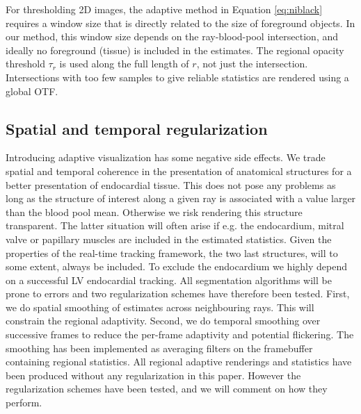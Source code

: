 For thresholding 2D images, the adaptive method in Equation \ref{eq:niblack} requires a window size that is directly related to the size of foreground objects. In our method, this window size depends on the ray-blood-pool intersection, and ideally no foreground (tissue) is included in the estimates. The regional opacity threshold $\tau_r$ is used along the full length of $r$, not just the intersection. Intersections with too few samples to give reliable statistics are rendered using a global OTF. 

\subsection{Spatial and temporal regularization}
Introducing adaptive visualization has some negative side effects. We trade spatial and temporal coherence in the presentation of anatomical structures for a better presentation of endocardial tissue. This does not pose any problems as long as the structure of interest along a given ray is associated with a value larger than the blood pool mean. Otherwise we risk rendering this structure transparent.
The latter situation will often arise if e.g. the endocardium, mitral valve or papillary muscles are included in the estimated statistics. Given the properties of the real-time tracking framework, the two last structures, will to some extent, always be included. To exclude the endocardium we highly depend on a successful LV endocardial tracking. All segmentation algorithms will  be prone to errors and two regularization schemes have therefore been tested. First, we do spatial smoothing of estimates across neighbouring rays. This will constrain the regional adaptivity. Second, we do temporal smoothing over successive frames to reduce the per-frame adaptivity and potential flickering\cite{Peterscha2005}. The smoothing has been implemented as averaging filters on the framebuffer containing regional statistics. All regional adaptive renderings and statistics have been produced without any regularization in this paper. However the regularization schemes have been tested, and we will comment on how they perform.


